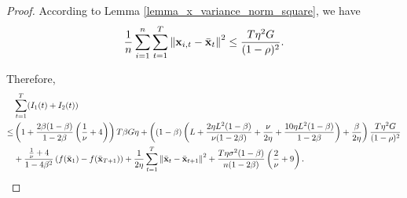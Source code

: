 \documentclass{article}
\begin{document}
\begin{proof}
According to Lemma \ref{lemma_x_variance_norm_square}, we have
\begin{align}
\nonumber
\frac{1}{n}\sum_{i=1}^n \sum_{t=1}^T \left\lVert{\bf x}_{i,t} - \bar{{\bf x}}_t\right\rVert^2 \le \frac{T \eta^2 G}{(1-\rho)^2}.
\end{align} 

Therefore, 
\begin{align}
\nonumber
&\sum_{t=1}^T (I_1(t) + I_2(t)) \\ \nonumber
\le & \left( 1 + \frac{2\beta(1-\beta)}{1-2\beta}\left( \frac{1}{\nu}+4 \right) \right)T\beta G \eta + \left(  (1-\beta)  \left(  L + \frac{2\eta L^2(1-\beta)}{\nu(1-2\beta)} + \frac{\nu}{2\eta} + \frac{10\eta L^2(1-\beta)}{1-2\beta}  \right) + \frac{\beta}{2\eta}  \right) \frac{T\eta^2 G}{(1-\rho)^2} \\ \nonumber 
&+ \frac{\frac{1}{\nu} + 4}{1-4\beta^2}\left( f(\bar{{\bf x}}_1) - f(\bar{{\bf x}}_{T+1}) \right) + \frac{1}{2\eta}\sum_{t=1}^T\left\lVert \bar{{\bf x}}_t - \bar{{\bf x}}_{t+1}\right\rVert^2 + \frac{T\eta \sigma^2 (1-\beta)}{n(1-2\beta)}\left( \frac{2}{\nu}+9 \right).
\end{align}







\end{proof}
\end{document}
